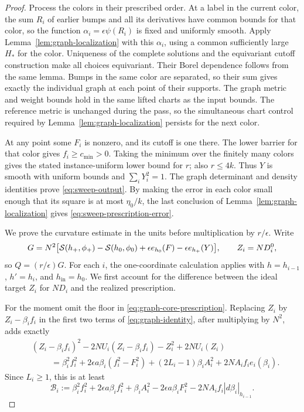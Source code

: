 \begin{proof}
Process the colors in their prescribed order.  At a label in
the current color, the sum \(R_i\) of earlier bumps and all its
derivatives have common bounds for that color, so the function
\(\alpha_i=\epsilon\psi(R_i)\) is fixed and uniformly smooth.
Apply Lemma~\ref{lem:graph-localization} with this
\(\alpha_i\), using a common sufficiently large \(H_*\) for
the color.  Uniqueness of the complete solutions and the
equivariant cutoff construction make all choices equivariant.
Their Borel dependence follows from the same lemma.  Bumps in
the same color are separated, so their sum gives exactly the
individual graph at each point of their supports.  The graph
metric and weight bounds hold in the same lifted charts as the input
bounds.  The reference metric is unchanged during the pass, so the
simultaneous chart control required by
Lemma~\ref{lem:graph-localization} persists for the next color.

At any point some \(F_i\) is nonzero, and its cutoff is one
there.  The lower barrier for that color gives
\(f_i\ge c_{\min}>0\).  Taking the minimum over the finitely
many colors gives the stated instance-uniform lower bound for
\(r\); also \(r\le4k\).  Thus \(Y\) is smooth with uniform
bounds and \(\sum_iY_i^2=1\).  The graph determinant and
density identities prove \eqref{eq:sweep-output}.
By making the error in each color small enough that its square
is at most \(\eta_0/k\), the last conclusion of
Lemma~\ref{lem:graph-localization} gives
\eqref{eq:sweep-prescription-error}.

We prove the curvature estimate in the units before
multiplication by \(r/\epsilon\).  Write
\[
 G=N^2\bigl[\mathcal S(h_+,\phi_+)-\mathcal S(h_0,\phi_0)
       +\epsilon e_{h_0}(F)-\epsilon e_{h_+}(Y)\bigr],
 \qquad Z_i=ND_i^0,
\]
so \(Q=(r/\epsilon)G\).  For each \(i\), the one-coordinate calculation
applies with \(h=h_{i-1}\), \(h'=h_i\), and
\(h_{\mathrm{in}}=h_0\).  We first account for the difference between
the ideal target \(Z_i\) for \(ND_i\) and the realized prescription.

For the moment omit the floor in
\eqref{eq:graph-core-prescription}.  Replacing \(Z_i\) by
\(Z_i-\beta_i f_i\) in the first two terms of
\eqref{eq:graph-identity}, after multiplying by \(N^2\),
adds exactly
\begin{align*}
 &(Z_i-\beta_i f_i)^2-2NU_i(Z_i-\beta_i f_i)
                 -Z_i^2+2NU_i(Z_i)\\
 &\hspace{1cm}=\beta_i^2f_i^2
       +2\epsilon a\beta_i(f_i^2-F_i^2)
       +(2L_i-1)\beta_iA_i^2
       +2NA_if_i e_i(\beta_i).
\end{align*}
Since \(L_i\ge1\), this is at least
\begin{equation}
 \mathcal B_i:=
 \beta_i^2f_i^2+2\epsilon a\beta_i f_i^2+\beta_i A_i^2
       -2\epsilon a\beta_iF_i^2
       -2NA_if_i|d\beta_i|_{h_{i-1}}.
 \label{eq:sweep-beta-correction}
\end{equation}


\end{proof}
